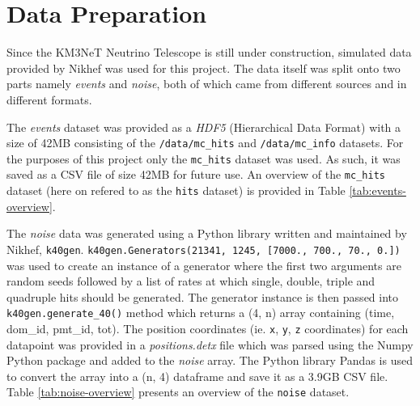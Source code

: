 
\chapter{Data Preparation} %


\graphicspath{{1-introduction/figures/}}


Since the KM3NeT Neutrino Telescope is still under construction, simulated data
provided by Nikhef was used for this project. The data itself was split onto
two parts namely \emph{events} and \emph{noise}, both of which came from
different sources and in different formats.

The \emph{events} dataset was provided as a \emph{HDF5} (Hierarchical Data
Format) with a size of 42MB consisting of the \texttt{/data/mc\_hits} and
\texttt{/data/mc\_info} datasets. For the purposes of this project only the
\texttt{mc\_hits} dataset was used. As such, it was saved as a CSV file of size
42MB for future use. An overview of the \texttt{mc\_hits} dataset (here on
refered to as the \texttt{hits} dataset) is provided in Table
\ref{tab:events-overview}.



The \emph{noise} data was generated using a Python library written and
maintained by Nikhef, \texttt{k40gen}. \texttt{k40gen.Generators(21341, 1245,
[7000., 700., 70., 0.])} was used to create an instance of a generator where
the first two arguments are random seeds followed by a list of rates at which
single, double, triple and quadruple hits should be generated. The generator
instance is then passed into \texttt{k40gen.generate\_40()} method which
returns a (4, n) array containing (time, dom\_id, pmt\_id, tot). The position
coordinates (ie. \texttt{x}, \texttt{y}, \texttt{z} coordinates) for each
datapoint was provided in a \emph{positions.detx} file which was parsed using
the Numpy Python package \cite{numpy} and added to the \emph{noise} array. The
Python library Pandas \cite{pandas} is used to convert the array into a (n, 4)
dataframe and save it as a 3.9GB CSV file. Table \ref{tab:noise-overview}
presents an overview of the \texttt{noise} dataset.

